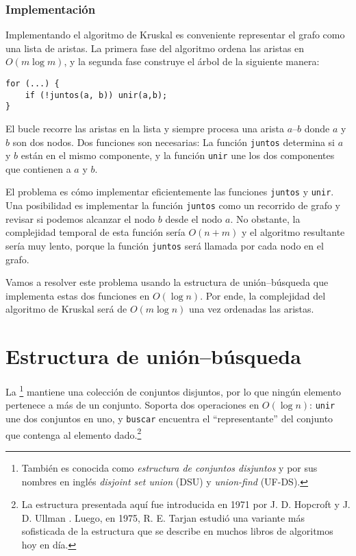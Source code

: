 \subsubsection{Implementación}

Implementando el algoritmo de Kruskal es conveniente representar
el grafo como una lista de aristas. La primera fase del algoritmo
ordena las aristas en $O(m \log m)$, y la segunda fase construye el
árbol de la siguiente manera:
\begin{lstlisting}
for (...) {
    if (!juntos(a, b)) unir(a,b);
}
\end{lstlisting}

El bucle recorre las aristas en la lista y siempre procesa una
arista $a$--$b$ donde $a$ y $b$ son dos nodos. Dos funciones son
necesarias: La función \texttt{juntos} determina si $a$ y $b$ están
en el mismo componente, y la función \texttt{unir} une los dos
componentes que contienen a $a$ y $b$.

El problema es cómo implementar eficientemente las funciones
\texttt{juntos} y \texttt{unir}. Una posibilidad es implementar
la función \texttt{juntos} como un recorrido de grafo y revisar si
podemos alcanzar el nodo $b$ desde el nodo $a$. No obstante, la
complejidad temporal de esta función sería $O(n+m)$ y el algoritmo
resultante sería muy lento, porque la función \texttt{juntos} será
llamada por cada nodo en el grafo.

Vamos a resolver este problema usando la estructura de unión--búsqueda
que implementa estas dos funciones en $O(\log n)$. Por ende, la
complejidad del algoritmo de Kruskal será de $O(m \log n)$ una vez
ordenadas las aristas.

\section{Estructura de unión--búsqueda}


La \footnote{También es conocida
    como \textit{estructura de conjuntos disjuntos} y
    por sus nombres en inglés \textit{disjoint set union} (DSU) y
    \textit{union-find} (UF-DS).} mantiene una colección de conjuntos
disjuntos, por lo que ningún elemento pertenece a más de un conjunto.
Soporta dos operaciones en $O(\log n)$: \texttt{unir} une dos
conjuntos en uno, y \texttt{buscar} encuentra el ``representante''
del conjunto que contenga al elemento dado.\footnote{La estructura
    presentada aquí fue introducida en 1971 por J. D. Hopcroft y
    J. D. Ullman \cite{hop71}. Luego, en 1975, R. E. Tarjan estudió
    una variante más sofisticada de la estructura \cite{tar75} que se
    describe en muchos libros de algoritmos hoy en día.}

